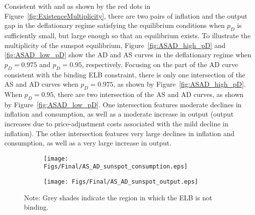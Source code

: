 \documentclass[11pt]{article}
\begin{document}
\begin{singlespace}
		Consistent with \citet{BonevaBraunWaki2016} and as shown by the red dots in Figure~\ref{fig:ExistenceMultiplicity}, there are two pairs of inflation and the output gap in the deflationary regime satisfying the equilibrium conditions when $p_{D}$ is sufficiently small, but large enough so that an equilibrium exists. To illustrate the multiplicity of the sunspot equilibrium, Figure~\ref{fig:ASAD_high_pD} and \ref{fig:ASAD_low_pD} show the AD and AS curves in the deflationary regime when $p_{D}=0.975$ and $p_{D}=0.95$, respectively. Focusing on the part of the AD curve consistent with the binding ELB constraint, there is only one intersection of the AS and AD curves when $p_{D}=0.975$, as shown by Figure~\ref{fig:ASAD_high_pD}. When $p_{D}=0.95$, there are two intersection of the AS and AD curves, as shown by Figure~\ref{fig:ASAD_low_pD}. One intersection features moderate declines in inflation and consumption, as well as a moderate increase in output (output increases due to price-adjustment costs associated with the mild decline in inflation). The other intersection features very large declines in inflation and consumption, as well as a very large increase in output. 
		
		\begin{figure}[H]
			\caption{AD and AS Curves in the Deflationary Regime\\---High $p_D$---} \label{fig:ASAD_high_pD}
	        \vspace{-1em}
			\begin{center}
				\begin{subfigure}[b]{0.4\textwidth}
					\centering
					\texttt{[image: Figs/Final/AS\_AD\_sunspot\_consumption.eps]}
				\end{subfigure}
				\hspace{0.5cm}  
				\begin{subfigure}[b]{0.4\textwidth}
					\centering
					\texttt{[image: Figs/Final/AS\_AD\_sunspot\_output.eps]}
				\end{subfigure}
			\end{center}
	        \vspace{-1em}
			{\footnotesize Note: Grey shades indicate the region in which the ELB is not binding.}
		\end{figure}
		

\end{singlespace}
\end{document}
